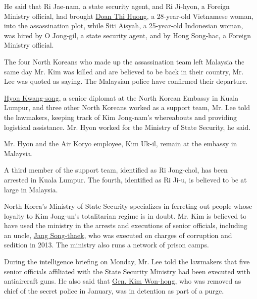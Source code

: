 He said that Ri Jae-nam, a state security agent, and Ri Ji-hyon, a
Foreign Ministry official, had brought
\href{https://www.nytimes.com/2017/02/24/world/asia/kim-jong-nam-suspect-doan-thi-huong.html}{Doan
Thi Huong}, a 28-year-old Vietnamese woman, into the assassination plot,
while
\href{https://www.nytimes.com/2017/02/25/world/asia/north-korea-kim-jong-nam-vx-nerve-agent-siti-aisyah.html}{Siti
Aisyah}, a 25-year-old Indonesian woman, was hired by O Jong-gil, a
state security agent, and by Hong Song-hac, a Foreign Ministry official.

The four North Koreans who made up the assassination team left Malaysia
the same day Mr. Kim was killed and are believed to be back in their
country, Mr. Lee was quoted as saying. The Malaysian police have
confirmed their departure.

\href{https://www.nytimes.com/2017/02/21/world/asia/kim-jong-nam-killing-malaysia-north-korea.html?rref=collection\%2Ftimestopic\%2FKim\%20Jong-un\&action=click\&contentCollection=timestopics\&region=stream\&module=stream_unit\&version=latest\&contentPlacement=9\&pgtype=collection}{Hyon
Kwang-song}, a senior diplomat at the North Korean Embassy in Kuala
Lumpur, and three other North Koreans worked as a support team, Mr. Lee
told the lawmakers, keeping track of Kim Jong-nam's whereabouts and
providing logistical assistance. Mr. Hyon worked for the Ministry of
State Security, he said.

Mr. Hyon and the Air Koryo employee, Kim Uk-il, remain at the embassy in
Malaysia.

A third member of the support team, identified as Ri Jong-chol, has been
arrested in Kuala Lumpur. The fourth, identified as Ri Ji-u, is believed
to be at large in Malaysia.

North Korea's Ministry of State Security specializes in ferreting out
people whose loyalty to Kim Jong-un's totalitarian regime is in doubt.
Mr. Kim is believed to have used the ministry in the arrests and
executions of senior officials, including an uncle,
\href{http://www.nytimes.com/2013/12/13/world/asia/north-korea-says-uncle-of-executed.html}{Jang
Song-thaek}, who was executed on charges of corruption and sedition in
2013. The ministry also runs a network of prison camps.

During the intelligence briefing on Monday, Mr. Lee told the lawmakers
that five senior officials affiliated with the State Security Ministry
had been executed with antiaircraft guns. He also said that
\href{https://www.nytimes.com/2017/02/03/world/asia/north-korea-purge-kim-jong-un-kim-won-hong.html?_r=0}{Gen.
Kim Won-hong}, who was removed as chief of the secret police in January,
was in detention as part of a purge.

